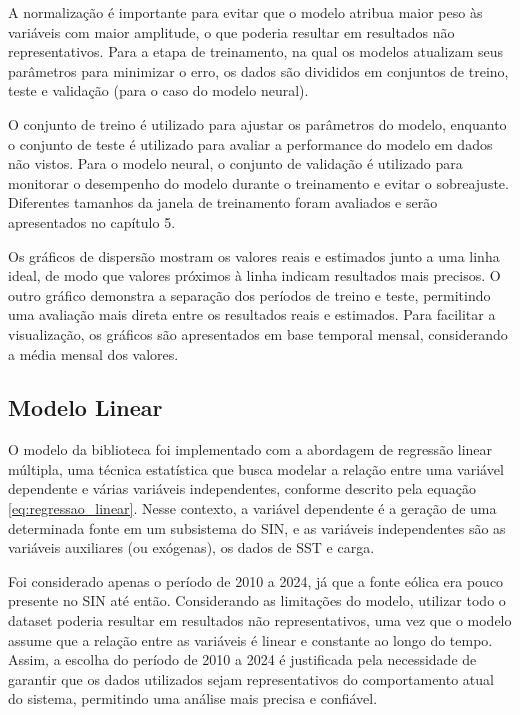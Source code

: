 A normalização é importante para evitar que o modelo atribua maior peso às variáveis com maior amplitude,
o que poderia resultar em resultados não representativos. Para a etapa de treinamento, na qual os modelos atualizam seus parâmetros 
para minimizar o erro, os dados são divididos em conjuntos de treino, teste e validação (para o caso do modelo neural). 

O conjunto de treino é utilizado para ajustar os parâmetros 
do modelo, enquanto o conjunto de teste é utilizado para avaliar a performance do modelo em dados não vistos. Para o modelo neural, 
o conjunto de validação é utilizado para monitorar o desempenho do modelo durante o treinamento e evitar o sobreajuste. 
Diferentes tamanhos da janela de treinamento foram avaliados e serão apresentados no capítulo 5.

Os gráficos de dispersão mostram os valores reais e estimados junto a uma linha ideal, de modo que valores próximos à linha indicam 
resultados mais precisos. O outro gráfico demonstra a separação dos períodos de treino e teste, permitindo uma avaliação mais direta entre os resultados reais e estimados.
Para facilitar a visualização, os gráficos são apresentados em base temporal mensal, considerando a média mensal dos valores.

\subsection{Modelo Linear} %
O modelo  da biblioteca  foi implementado com a abordagem de regressão linear múltipla, 
uma técnica estatística que busca modelar a relação entre uma variável dependente e várias variáveis independentes, conforme descrito pela 
equação \ref{eq:regressao_linear}. Nesse contexto, a variável dependente é a geração de uma determinada fonte em um subsistema do 
SIN, e as variáveis independentes são as variáveis auxiliares (ou exógenas), os dados de SST e carga.

Foi considerado apenas o período de 2010 a 2024, já que a fonte eólica era pouco presente
no SIN até então. Considerando as limitações do modelo, utilizar todo o dataset poderia resultar em resultados não representativos, 
uma vez que o modelo assume que a relação entre as variáveis é linear e constante ao longo do tempo. Assim, a escolha do período 
de 2010 a 2024 é justificada pela necessidade de garantir que os dados utilizados sejam representativos do comportamento atual 
do sistema, permitindo uma análise mais precisa e confiável.


